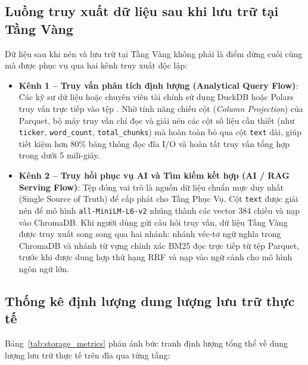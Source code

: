 \subsection{Luồng truy xuất dữ liệu sau khi lưu trữ tại Tầng Vàng}
Dữ liệu sau khi nén và lưu trữ tại Tầng Vàng không phải là điểm dừng cuối cùng mà được phục vụ qua hai kênh truy xuất độc lập:
\begin{itemize}
    \item \textbf{Kênh 1 -- Truy vấn phân tích định lượng (Analytical Query Flow)}: Các kỹ sư dữ liệu hoặc chuyên viên tài chính sử dụng DuckDB hoặc Polars truy vấn trực tiếp vào tệp . Nhờ tính năng chiếu cột (\textit{Column Projection}) của Parquet, bộ máy truy vấn chỉ đọc và giải nén các cột số liệu cần thiết (như \texttt{ticker}, \texttt{word\_count}, \texttt{total\_chunks}) mà hoàn toàn bỏ qua cột \texttt{text} dài, giúp tiết kiệm hơn 80\% băng thông đọc đĩa I/O và hoàn tất truy vấn tổng hợp trong dưới 5 mili-giây.
    \item \textbf{Kênh 2 -- Truy hồi phục vụ AI và Tìm kiếm kết hợp (AI / RAG Serving Flow)}: Tệp  đóng vai trò là nguồn dữ liệu chuẩn mực duy nhất (Single Source of Truth) để cấp phát cho Tầng Phục Vụ. Cột \texttt{text} được giải nén để mô hình \texttt{all-MiniLM-L6-v2} nhúng thành các vector 384 chiều và nạp vào ChromaDB. Khi người dùng gửi câu hỏi truy vấn, dữ liệu Tầng Vàng được truy xuất song song qua hai nhánh: nhánh véc-tơ ngữ nghĩa trong ChromaDB và nhánh từ vựng chính xác BM25 đọc trực tiếp từ tệp Parquet, trước khi được dung hợp thứ hạng RRF và nạp vào ngữ cảnh cho mô hình ngôn ngữ lớn.
\end{itemize}

\subsection{Thống kê định lượng dung lượng lưu trữ thực tế}
Bảng~\ref{tab:storage_metrics} phản ánh bức tranh định lượng tổng thể về dung lượng lưu trữ thực tế trên đĩa qua từng tầng:

